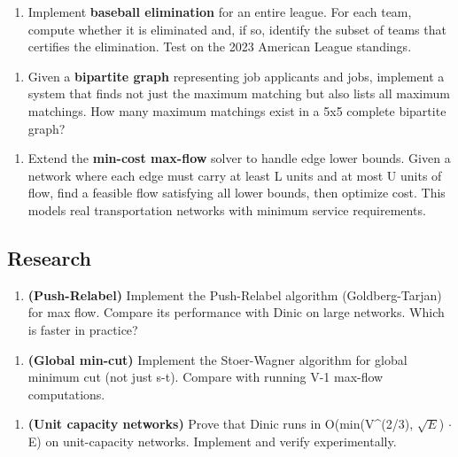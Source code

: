 \begin{enumerate}
\item Implement \textbf{baseball elimination} for an entire league. For each team, compute whether it is eliminated and, if so, identify the subset of teams that certifies the elimination. Test on the 2023 American League standings.
\end{enumerate}

\begin{enumerate}
\item Given a \textbf{bipartite graph} representing job applicants and jobs, implement a system that finds not just the maximum matching but also lists all maximum matchings. How many maximum matchings exist in a 5x5 complete bipartite graph?
\end{enumerate}

\begin{enumerate}
\item Extend the \textbf{min-cost max-flow} solver to handle edge lower bounds. Given a network where each edge must carry at least L units and at most U units of flow, find a feasible flow satisfying all lower bounds, then optimize cost. This models real transportation networks with minimum service requirements.
\end{enumerate}

\subsection{Research}

\begin{enumerate}
\item \textbf{(Push-Relabel)} Implement the Push-Relabel algorithm (Goldberg-Tarjan) for max flow. Compare its performance with Dinic on large networks. Which is faster in practice?
\end{enumerate}

\begin{enumerate}
\item \textbf{(Global min-cut)} Implement the Stoer-Wagner algorithm for global minimum cut (not just s-t). Compare with running V-1 max-flow computations.
\end{enumerate}

\begin{enumerate}
\item \textbf{(Unit capacity networks)} Prove that Dinic runs in O(min(V\textasciicircum{}(2/3), $\sqrt {E}$) $\cdot $ E) on unit-capacity networks. Implement and verify experimentally.
\end{enumerate}

